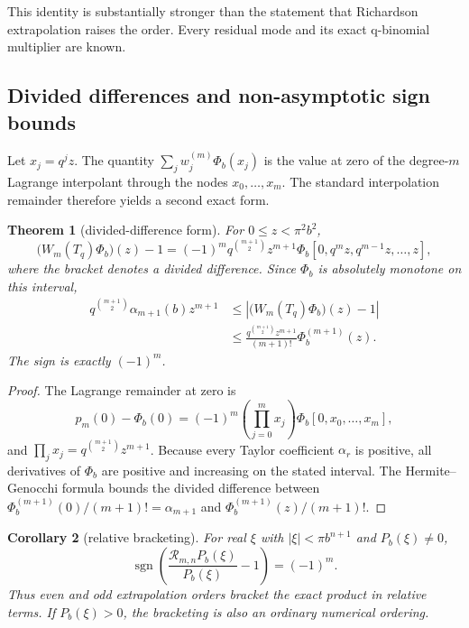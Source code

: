 \documentclass[11pt]{article}
\newtheorem{theorem}{Theorem}[section]
\newtheorem{corollary}[theorem]{Corollary}
\theoremstyle{definition}
\theoremstyle{remark}
\newcommand{\abs}[1]{\left\lvert #1\right\rvert}
\DeclareMathOperator{\sgn}{sgn}
\begin{document}
This identity is substantially stronger than the statement that Richardson
extrapolation raises the order. Every residual mode and its exact q-binomial
multiplier are known.

\subsection{Divided differences and non-asymptotic sign bounds}

Let \(x_j=q^jz\). The quantity
\(\sum_jw_j^{(m)}\Phi_b(x_j)\) is the value at zero of the degree-\(m\)
Lagrange interpolant through the nodes \(x_0,\ldots,x_m\). The standard
interpolation remainder therefore yields a second exact form.

\begin{theorem}[divided-difference form]
\label{thm:divdiff}
For \(0\leq z<\pi^2b^2\),
\begin{equation}
 \bigl(W_m(T_q)\Phi_b\bigr)(z)-1
 =(-1)^m q^{\binom{m+1}{2}}z^{m+1}
 \Phi_b[0,q^mz,q^{m-1}z,\ldots,z],
 \label{eq:divdiff}
\end{equation}
where the bracket denotes a divided difference. Since \(\Phi_b\) is absolutely
monotone on this interval,
\begin{align}
 q^{\binom{m+1}{2}}\alpha_{m+1}(b)z^{m+1}
 &\leq
 \abs{\bigl(W_m(T_q)\Phi_b\bigr)(z)-1}
 \label{eq:lowerbound}\\
 &\leq
 \frac{q^{\binom{m+1}{2}}z^{m+1}}{(m+1)!}
 \Phi_b^{(m+1)}(z).
 \label{eq:upperbound}
\end{align}
The sign is exactly \((-1)^m\).
\end{theorem}

\begin{proof}
The Lagrange remainder at zero is
\[
 p_m(0)-\Phi_b(0)=(-1)^m\left(\prod_{j=0}^mx_j\right)
 \Phi_b[0,x_0,\ldots,x_m],
\]
and \(\prod_jx_j=q^{\binom{m+1}{2}}z^{m+1}\). Because every Taylor
coefficient \(\alpha_r\) is positive, all derivatives of \(\Phi_b\) are positive
and increasing on the stated interval. The Hermite--Genocchi formula bounds the
divided difference between
\(\Phi_b^{(m+1)}(0)/(m+1)!=\alpha_{m+1}\) and
\(\Phi_b^{(m+1)}(z)/(m+1)!\).
\end{proof}

\begin{corollary}[relative bracketing]
\label{cor:bracket}
For real \(\xi\) with \(\abs\xi<\pi b^{n+1}\) and \(P_b(\xi)\ne0\),
\begin{equation}
 \sgn\!\left(\frac{\mathcal R_{m,n}P_b(\xi)}{P_b(\xi)}-1\right)=(-1)^m.
 \label{eq:signlaw}
\end{equation}
Thus even and odd extrapolation orders bracket the exact product in relative
terms. If \(P_b(\xi)>0\), the bracketing is also an ordinary numerical ordering.
\end{corollary}
\end{document}
